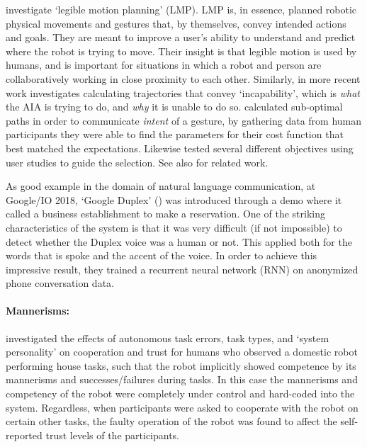\citet{Dragan2013-wd} investigate `legible motion planning' (LMP). LMP is, in essence, planned robotic physical movements and gestures that, by themselves, convey intended actions and goals. They are meant to improve a user's ability to understand and predict where the robot is trying to move. Their insight is that legible motion is used by humans, and is important for situations in which a robot and person are collaboratively working in close proximity to each other. Similarly, in more recent work \citet{Kwon2018-xt} investigates calculating trajectories that convey `incapability', which is \emph{what} the AIA is trying to do, and \emph{why} it is unable to do so. \cite{Dragan2013-wd} calculated sub-optimal paths in order to communicate \emph{intent} of a gesture, by gathering data from human participants they were able to find the parameters for their cost function that best matched the expectations. Likewise \cite{Kwon2018-xt} tested several different objectives using user studies to guide the selection. See also \cite{Admoni2016-db} for related work.

As good example in the domain of natural language communication, at Google/IO 2018, `Google Duplex' (\cite{Google2018-eb}) was introduced through a demo where it called a business establishment to make a reservation. One of the striking characteristics of the system is that it was very difficult (if not impossible) to detect whether the Duplex voice was a human or not. This applied both for the words that is spoke and the accent of the voice. In order to achieve this impressive result, they trained a recurrent neural network (RNN) on anonymized phone conversation data.


\paragraph{Mannerisms:}
\citet{Salem2015-md} investigated the effects of autonomous task errors, task types, and `system personality' on cooperation and trust for humans who observed a domestic robot performing house tasks, such that the robot implicitly showed competence by its mannerisms and successes/failures during tasks. In this case the mannerisms and competency of the robot were completely under control and hard-coded into the system. Regardless, when participants were asked to cooperate with the robot on certain other tasks, the faulty operation of the robot was found to affect the self-reported trust levels of the participants.

